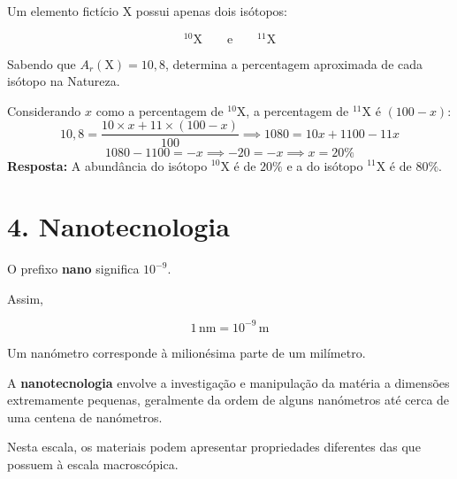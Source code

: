 \documentclass[11pt,a4paper]{article}
\begin{document}
	\begin{desafio}
		
		Um elemento fictício \(\mathrm{X}\) possui apenas dois isótopos:
		
		\[
		{}^{10}\mathrm{X}
		\qquad\text{e}\qquad
		{}^{11}\mathrm{X}
		\]
		
		Sabendo que \(A_r(\mathrm{X})=10,8\), determina a percentagem aproximada de cada isótopo na Natureza.
		
		\begin{solucao}
			Considerando \(x\) como a percentagem de \({}^{10}\mathrm{X}\), a percentagem de \({}^{11}\mathrm{X}\) é \((100 - x)\):
			\[
			10,8 = \frac{10 \times x + 11 \times (100 - x)}{100} \implies 1080 = 10x + 1100 - 11x
			\]
			\[
			1080 - 1100 = -x \implies -20 = -x \implies x = 20\%
			\]
			\textbf{Resposta:} A abundância do isótopo \({}^{10}\mathrm{X}\) é de \textbf{\(20\%\)} e a do isótopo \({}^{11}\mathrm{X}\) é de \textbf{\(80\%\)}.
		\end{solucao}
		
	\end{desafio}
	
	
	\newpage
	
	\section*{\textcolor{eugreen}{4. Nanotecnologia}}
	
	\begin{stem}
		
		O prefixo \textbf{nano} significa \(10^{-9}\).
		
		Assim,
		
		\[
		\boxed{
			1\,\mathrm{nm}=10^{-9}\,\mathrm{m}
		}
		\]
		
		Um nanómetro corresponde à milionésima parte de um milímetro.
		
		A \textbf{nanotecnologia} envolve a investigação e manipulação da matéria
		a dimensões extremamente pequenas, geralmente da ordem de alguns
		nanómetros até cerca de uma centena de nanómetros.
		
		Nesta escala, os materiais podem apresentar propriedades diferentes das
		que possuem à escala macroscópica.
		
	\end{stem}
	
	
\end{document}
